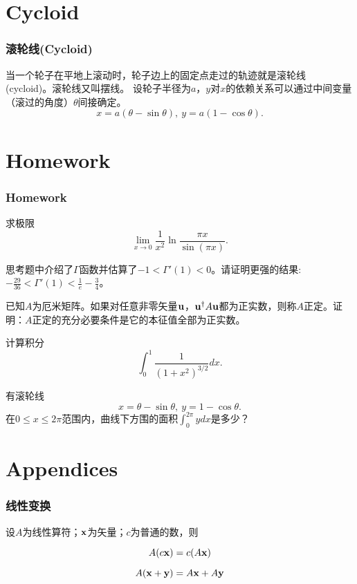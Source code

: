 \documentclass[CJK,13pt]{beamer}
\begin{document}


\section{Cycloid}


\begin{frame}
  \frametitle{滚轮线(Cycloid)}
  当一个轮子在平地上滚动时，轮子边上的固定点走过的轨迹就是滚轮线 (cycloid)。滚轮线又叫摆线。
  设轮子半径为$a$，$y$对$x$的依赖关系可以通过中间变量（滚过的角度）$\theta$间接确定。
  $$x=a(\theta-\sin\theta) ,\ y=a(1-\cos\theta). $$


\end{frame}


\section{Homework}

\begin{frame}
  \frametitle{Homework}
  \bitem
\item{求极限$$\lim_{x\rightarrow 0}\frac{1}{x^2} \ln\frac{\pi x}{\sin (\pi x)}.$$}
\item{思考题中介绍了$\Gamma$函数并估算了$-1<\Gamma'(1)<0$。请证明更强的结果: $-\frac{29}{36}<\Gamma'(1)<\frac{1}{e}-\frac{3}{4}$。}  
\item{已知$A$为厄米矩阵。如果对任意非零矢量${\mathbf{u}}$，${\mathbf{u}}^\dagger A{\mathbf{u}} $都为正实数，则称$A$正定。证明：$A$正定的充分必要条件是它的本征值全部为正实数。}
\item{计算积分$$\int_0^1\frac{1}{(1+x^2)^{3/2}}dx.$$}
\item{有滚轮线$$x=\theta-\sin\theta ,\ y=1-\cos\theta.$$
  在$0\le x\le 2\pi$范围内，曲线下方围的面积$\int_0^{2\pi} y dx$是多少？}
  \eitem
\end{frame}


\section{Appendices}


\begin{frame}
  \frametitle{线性变换}

  设$A$为线性算符；${\mathbf{x}}$为矢量；$c$为普通的数，则
  
  $$ A (c{\mathbf{x}}) = c (A{\mathbf{x}}) $$  

  $$ A({\mathbf{x}} +{\mathbf{y}})= A{\mathbf{x}} + A{\mathbf{y}} $$

\end{frame}
\end{document}

